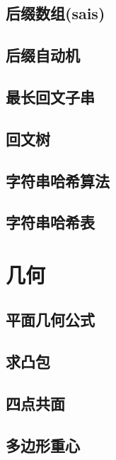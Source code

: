 \section{后缀数组(sais)}
\raggedbottom
\hrulefill
\section{后缀自动机}
\raggedbottom
\hrulefill
\section{最长回文子串}
\raggedbottom
\hrulefill
\section{回文树}
\raggedbottom
\hrulefill
\section{字符串哈希算法}
\raggedbottom
\hrulefill
\section{字符串哈希表}
\raggedbottom
\hrulefill

\chapter{几何}
\section{平面几何公式}
\raggedbottom
\hrulefill
\section{求凸包}
\raggedbottom
\hrulefill
\section{四点共面}
\raggedbottom
\hrulefill
\section{多边形重心}
\raggedbottom
\hrulefill
